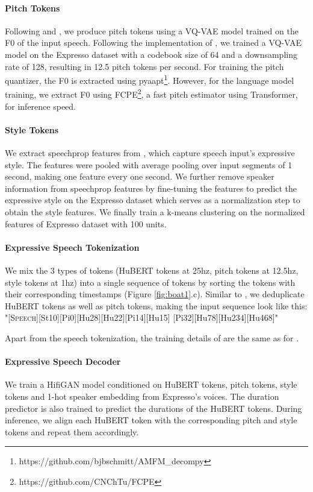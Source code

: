 \paragraph{Pitch Tokens} Following \citet{polyak2021speechresynthesis} and \citet{kharitonov2022pgslm}, we produce pitch tokens using a VQ-VAE \citep{vandenoord2017VQVAE} model trained on the F0 of the input speech.
Following the implementation of \citet{polyak2021speechresynthesis},
we trained a VQ-VAE model on the Expresso \citep{nguyen2023expresso} dataset with a codebook size of 64 and a downsampling rate of 128, resulting in 12.5 pitch tokens per second.
For training the pitch quantizer, the F0 is extracted using pyaapt\footnote{https://github.com/bjbschmitt/AMFM\_decompy}.
However, for the language model training, we extract F0 using FCPE\footnote{https://github.com/CNChTu/FCPE}, a fast pitch estimator using Transformer, for inference speed.

\paragraph{Style Tokens} We extract speechprop features from \citet{Duquenne2023sonarexp_arxiv}, which capture speech input's expressive style. The features were pooled with average pooling over input segments of 1 second, making one feature every one second. We further remove speaker information from speechprop features by fine-tuning the features to predict the expressive style on the Expresso dataset which serves as a normalization step to obtain the style features. We finally train a k-means clustering on the normalized features of Expresso dataset with 100 units.

\paragraph{Expressive Speech Tokenization} We mix the 3 types of tokens (HuBERT tokens at 25hz, pitch tokens at 12.5hz, style tokens at 1hz) into a single sequence of tokens by sorting the tokens with their corresponding timestamps (Figure \ref{fig:boat1}.c). Similar to \spotbase, we deduplicate HuBERT tokens as well as pitch tokens, making the input sequence look like this: "\textsc{[Speech]}[St10][Pi0][Hu28][Hu22][Pi14][Hu15] [Pi32][Hu78][Hu234][Hu468]"

Apart from the speech tokenization, the training details of \spotexpressive are the same as for \spotbase.

\paragraph{Expressive Speech Decoder} We train a HifiGAN model conditioned on HuBERT tokens, pitch tokens, style tokens and 1-hot speaker embedding from Expresso's voices.
The duration predictor is also trained to predict the durations of the HuBERT tokens. During inference, we align each HuBERT token with the corresponding pitch and style tokens and repeat them accordingly.

